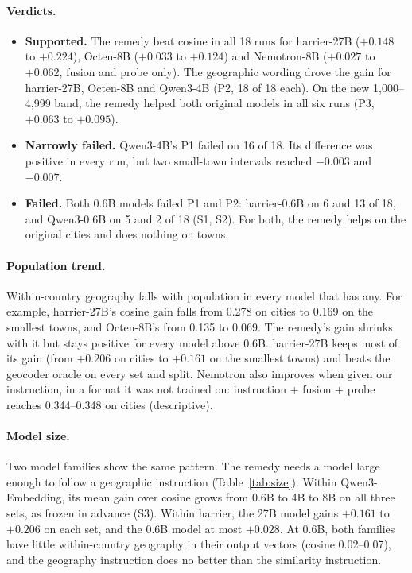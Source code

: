 \paragraph{Verdicts.}
\begin{itemize}
\item \textbf{Supported.} The remedy beat cosine in all 18 runs for harrier-27B ($+0.148$ to $+0.224$), Octen-8B ($+0.033$ to $+0.124$) and Nemotron-8B ($+0.027$ to $+0.062$, fusion and probe only). The geographic wording drove the gain for harrier-27B, Octen-8B and Qwen3-4B (P2, 18 of 18 each). On the new 1,000--4,999 band, the remedy helped both original models in all six runs (P3, $+0.063$ to $+0.095$).
\item \textbf{Narrowly failed.} Qwen3-4B's P1 failed on 16 of 18. Its difference was positive in every run, but two small-town intervals reached $-0.003$ and $-0.007$.
\item \textbf{Failed.} Both 0.6B models failed P1 and P2: harrier-0.6B on 6 and 13 of 18, and Qwen3-0.6B on 5 and 2 of 18 (S1, S2). For both, the remedy helps on the original cities and does nothing on towns.
\end{itemize}

\paragraph{Population trend.}
Within-country geography falls with population in every model that has any. For example, harrier-27B's cosine gain falls from 0.278 on cities to 0.169 on the smallest towns, and Octen-8B's from 0.135 to 0.069. The remedy's gain shrinks with it but stays positive for every model above 0.6B. harrier-27B keeps most of its gain (from $+0.206$ on cities to $+0.161$ on the smallest towns) and beats the geocoder oracle on every set and split. Nemotron also improves when given our instruction, in a format it was not trained on: instruction + fusion + probe reaches 0.344--0.348 on cities (descriptive).

\paragraph{Model size.}
Two model families show the same pattern. The remedy needs a model large enough to follow a geographic instruction (Table~\ref{tab:size}). Within Qwen3-Embedding, its mean gain over cosine grows from 0.6B to 4B to 8B on all three sets, as frozen in advance (S3). Within harrier, the 27B model gains $+0.161$ to $+0.206$ on each set, and the 0.6B model at most $+0.028$. At 0.6B, both families have little within-country geography in their output vectors (cosine 0.02--0.07), and the geography instruction does no better than the similarity instruction.


